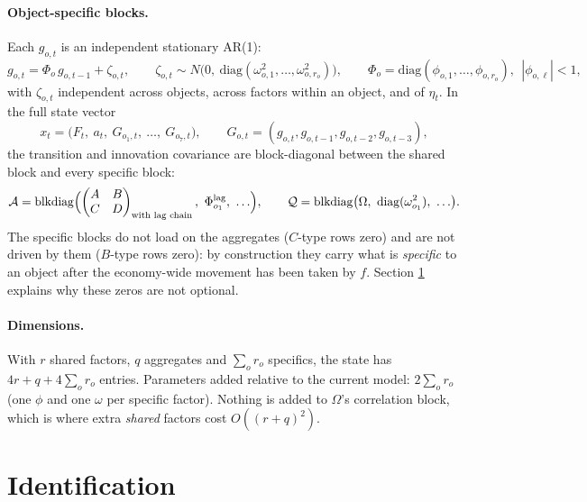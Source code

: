 \documentclass[11pt]{article}
\newcommand{\diag}{\mathrm{diag}}
\begin{document}
\paragraph{Object-specific blocks.} Each $g_{o,t}$ is an independent stationary
AR(1):
\begin{equation}
  g_{o,t} = \Phi_o\, g_{o,t-1} + \zeta_{o,t},
  \qquad \zeta_{o,t}\sim N\bigl(0,\ \diag(\omega_{o,1}^2,\ldots,\omega_{o,r_o}^2)\bigr),
  \qquad \Phi_o = \diag(\phi_{o,1},\ldots,\phi_{o,r_o}),\ \ |\phi_{o,\ell}| < 1,
  \label{eq:specific}
\end{equation}
with $\zeta_{o,t}$ independent across objects, across factors within an object,
and of $\eta_t$. In the full state vector
\begin{equation}
  x_t = \bigl(F_t,\ a_t,\ G_{o_1,t},\ \ldots,\ G_{o_7,t}\bigr),
  \qquad G_{o,t} = (g_{o,t}, g_{o,t-1}, g_{o,t-2}, g_{o,t-3}),
\end{equation}
the transition and innovation covariance are block-diagonal between the shared
block and every specific block:
\begin{equation}
  \mathcal{A} = \mathrm{blkdiag}\Bigl(\begin{pmatrix} A&B\\C&D\end{pmatrix}_{\text{with lag chain}},\ \Phi_{o_1}^{\text{lag}},\ \ldots\Bigr),
  \qquad
  \mathcal{Q} = \mathrm{blkdiag}\bigl(\Omega,\ \diag(\omega^2_{o_1}),\ \ldots\bigr).
\end{equation}
The specific blocks do not load on the aggregates ($C$-type rows zero) and are
not driven by them ($B$-type rows zero): by construction they carry what is
\emph{specific} to an object after the economy-wide movement has been taken by
$f$. Section \ref{sec:ident} explains why these zeros are not optional.

\paragraph{Dimensions.} With $r$ shared factors, $q$ aggregates and $\sum_o r_o$
specifics, the state has $4r + q + 4\sum_o r_o$ entries. Parameters added
relative to the current model: $2\sum_o r_o$ (one $\phi$ and one $\omega$ per
specific factor). Nothing is added to $\Omega$'s correlation block, which is
where extra \emph{shared} factors cost $O((r+q)^2)$.

\section{Identification}\label{sec:ident}
\end{document}
